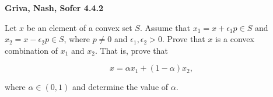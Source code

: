 \textbf{Griva, Nash, Sofer 4.4.2}

Let $x$ be an element of a convex set $S$. Assume that $x_1 = x + \epsilon_1 p \in S$ \linebreak 
and $x_2 = x - \epsilon_2 p \in S$, where $p \neq 0$ and $\epsilon_1, \epsilon_2 > 0$. Prove that $x$ is a convex 
combination of $x_1$ and $x_2$. That is, prove that

$$
x = \alpha x_1 + (1 - \alpha) x_2,
$$

where $\alpha \in (0, 1)$ and determine the value of $\alpha$.

\begin{solution}
  \ \\
  \ \vfill
  \ \\
\end{solution}